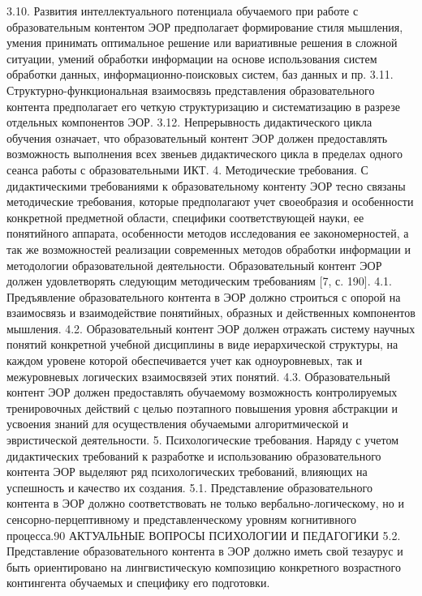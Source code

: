 3.10. Развития интеллектуального потенциала обучаемого при работе с образовательным контентом ЭОР предполагает формирование стиля мышления,
умения принимать оптимальное решение или вариативные решения в сложной
ситуации, умений обработки информации на основе использования систем
обработки данных, информационно-поисковых систем, баз данных и пр.
3.11. Структурно-функциональная взаимосвязь представления образовательного контента предполагает его четкую структуризацию и систематизацию в разрезе отдельных компонентов ЭОР.
3.12. Непрерывность дидактического цикла обучения означает, что образовательный контент ЭОР должен предоставлять возможность выполнения всех звеньев дидактического цикла в пределах одного сеанса работы с
образовательными ИКТ.
4. Методические требования.
С дидактическими требованиями к образовательному контенту ЭОР
тесно связаны методические требования, которые предполагают учет своеобразия и особенности конкретной предметной области, специфики соответствующей науки, ее понятийного аппарата, особенности методов исследования ее закономерностей, а так же возможностей реализации современных методов обработки информации и методологии образовательной деятельности. Образовательный контент ЭОР должен удовлетворять следующим методическим требованиям [7, с. 190].
4.1. Предъявление образовательного контента в ЭОР должно строиться
с опорой на взаимосвязь и взаимодействие понятийных, образных и действенных компонентов мышления.
4.2. Образовательный контент ЭОР должен отражать систему научных
понятий конкретной учебной дисциплины в виде иерархической структуры,
на каждом уровене которой обеспечивается учет как одноуровневых, так и
межуровневых логических взаимосвязей этих понятий.
4.3. Образовательный контент ЭОР должен предоставлять обучаемому
возможность контролируемых тренировочных действий с целью поэтапного
повышения уровня абстракции и усвоения знаний для осуществления обучаемыми алгоритмической и эвристической деятельности.
5. Психологические требования.
Наряду с учетом дидактических требований к разработке и использованию образовательного контента ЭОР выделяют ряд психологических требований, влияющих на успешность и качество их создания.
5.1. Представление образовательного контента в ЭОР должно соответствовать не только вербально-логическому, но и сенсорно-перцептивному и
представленческому уровням когнитивного процесса.90
АКТУАЛЬНЫЕ ВОПРОСЫ ПСИХОЛОГИИ И ПЕДАГОГИКИ
5.2. Представление образовательного контента в ЭОР должно иметь
свой тезаурус и быть ориентировано на лингвистическую композицию конкретного возрастного контингента обучаемых и специфику его подготовки.
